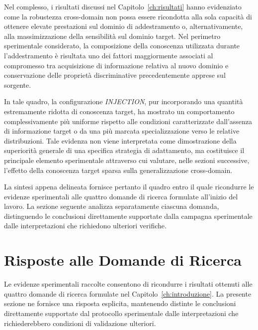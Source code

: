 Nel complesso, i risultati discussi nel Capitolo~\ref{ch:risultati} hanno evidenziato come la robustezza cross-domain non possa essere ricondotta alla sola capacità di ottenere elevate prestazioni sul dominio di addestramento o, alternativamente, alla massimizzazione della sensibilità sul dominio target. 
Nel perimetro sperimentale considerato, la composizione della conoscenza utilizzata durante l'addestramento è risultata uno dei fattori maggiormente associati al compromesso tra acquisizione di informazione relativa al nuovo dominio e conservazione delle proprietà discriminative precedentemente apprese sul sorgente.

In tale quadro, la configurazione \textit{INJECTION}, pur incorporando una quantità estremamente ridotta di conoscenza target, ha mostrato un comportamento complessivamente più uniforme rispetto alle condizioni caratterizzate dall'assenza di informazione target o da una più marcata specializzazione verso le relative distribuzioni. 
Tale evidenza non viene interpretata come dimostrazione della superiorità generale di una specifica strategia di adattamento, ma costituisce il principale elemento sperimentale attraverso cui valutare, nelle sezioni successive, l'effetto della conoscenza target sparsa sulla generalizzazione cross-domain.

La sintesi appena delineata fornisce pertanto il quadro entro il quale ricondurre le evidenze sperimentali alle quattro domande di ricerca formulate all'inizio del lavoro. 
La sezione seguente analizza separatamente ciascuna domanda, distinguendo le conclusioni direttamente supportate dalla campagna sperimentale dalle interpretazioni che richiedono ulteriori verifiche.




\section{Risposte alle Domande di Ricerca}
\label{sec:risposte_rq}

Le evidenze sperimentali raccolte consentono di ricondurre i risultati ottenuti alle quattro domande di ricerca formulate nel Capitolo~\ref{ch:introduzione}.
La presente sezione ne fornisce una risposta esplicita, mantenendo distinte le conclusioni direttamente supportate dal protocollo sperimentale dalle interpretazioni che richiederebbero condizioni di validazione ulteriori.


